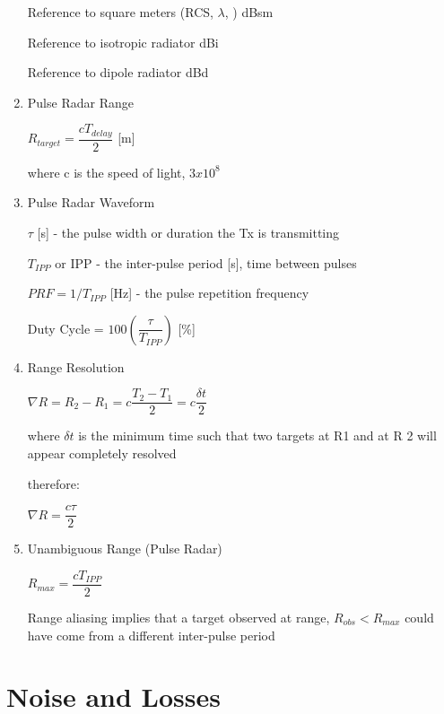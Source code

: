 \documentclass[10pt]{article}
\renewcommand{\frac}{\dfrac}
\begin{document}
\begin{enumerate}
Reference to square meters (RCS, $\lambda$, ) dBsm

Reference to isotropic radiator dBi

Reference to dipole radiator dBd

\item Pulse Radar Range

	\centerline{$R_{target} = \frac{c T_{delay}}{2}$ [m]} 
	
	where c is the speed of light, $3x10^8$
	
	
\item Pulse Radar Waveform

	$\tau$ [s] - the pulse width or duration the Tx is transmitting
	
	$T_{IPP}$ or IPP - the inter-pulse period [s], time between pulses
	
	$PRF = 1/T_{IPP}$ [Hz]  - the pulse repetition frequency
	
	Duty Cycle = $100(\frac{\tau}{T_{IPP}})$ [\%]
	
	
\item Range Resolution
	
	\centerline{$\nabla R = R_2 - R_1 = c\frac{T_2 - T_1}{2} = c\frac{\delta t}{2}$}
	
	where $\delta t$ is the minimum time such that two targets at R1 and at R 2
	will appear completely resolved

	therefore:

	\centerline{$\nabla R = \frac{c\tau}{2}$}
	
\item Unambiguous Range (Pulse Radar)

	\centerline{$R_{max} = \frac{c T_{IPP}}{2}$}
	
	Range aliasing implies that a target observed at range, $R_{obs} < R_{max}$
could have come from a different inter-pulse period
	
\end{enumerate}

\section*{Noise and Losses}
\end{document}
